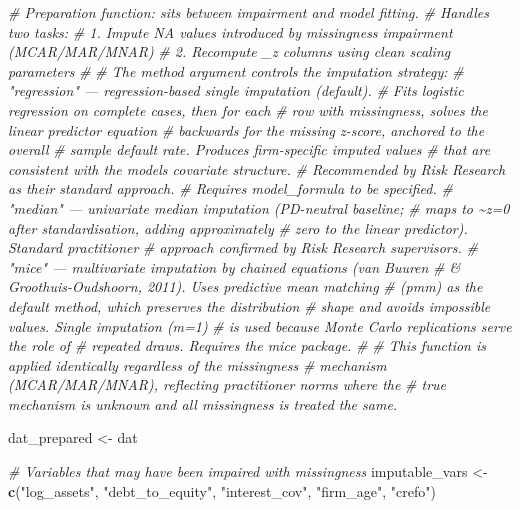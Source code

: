 \documentclass[
]{article}
\newenvironment{Shaded}{\begin{snugshade}}{\end{snugshade}}
\newcommand{\CommentTok}[1]{\textcolor[rgb]{0.56,0.35,0.01}{\textit{#1}}}
\newcommand{\FunctionTok}[1]{\textcolor[rgb]{0.13,0.29,0.53}{\textbf{#1}}}
\newcommand{\NormalTok}[1]{#1}
\newcommand{\OtherTok}[1]{\textcolor[rgb]{0.56,0.35,0.01}{#1}}
\newcommand{\StringTok}[1]{\textcolor[rgb]{0.31,0.60,0.02}{#1}}
\begin{document}
\begin{Shaded}
\begin{Highlighting}[]
  \CommentTok{\# Preparation function: sits between impairment and model fitting.}
  \CommentTok{\# Handles two tasks:}
  \CommentTok{\#   1. Impute NA values introduced by missingness impairment (MCAR/MAR/MNAR)}
  \CommentTok{\#   2. Recompute \_z columns using clean scaling parameters}
  \CommentTok{\#}
  \CommentTok{\# The method argument controls the imputation strategy:}
  \CommentTok{\#   "regression" — regression{-}based single imputation (default).}
  \CommentTok{\#              Fits logistic regression on complete cases, then for each}
  \CommentTok{\#              row with missingness, solves the linear predictor equation}
  \CommentTok{\#              backwards for the missing z{-}score, anchored to the overall}
  \CommentTok{\#              sample default rate. Produces firm{-}specific imputed values}
  \CommentTok{\#              that are consistent with the model\textquotesingle{}s covariate structure.}
  \CommentTok{\#              Recommended by Risk Research as their standard approach.}
  \CommentTok{\#              Requires model\_formula to be specified.}
  \CommentTok{\#   "median" — univariate median imputation (PD{-}neutral baseline;}
  \CommentTok{\#              maps to \textasciitilde{}z=0 after standardisation, adding approximately}
  \CommentTok{\#              zero to the linear predictor). Standard practitioner}
  \CommentTok{\#              approach confirmed by Risk Research supervisors.}
  \CommentTok{\#   "mice"  — multivariate imputation by chained equations (van Buuren}
  \CommentTok{\#              \& Groothuis{-}Oudshoorn, 2011). Uses predictive mean matching}
  \CommentTok{\#              (pmm) as the default method, which preserves the distribution}
  \CommentTok{\#              shape and avoids impossible values. Single imputation (m=1)}
  \CommentTok{\#              is used because Monte Carlo replications serve the role of}
  \CommentTok{\#              repeated draws. Requires the mice package.}
  \CommentTok{\#}
  \CommentTok{\# This function is applied identically regardless of the missingness}
  \CommentTok{\# mechanism (MCAR/MAR/MNAR), reflecting practitioner norms where the}
  \CommentTok{\# true mechanism is unknown and all missingness is treated the same.}
  
\NormalTok{  dat\_prepared }\OtherTok{\textless{}{-}}\NormalTok{ dat}
  
  \CommentTok{\# Variables that may have been impaired with missingness}
\NormalTok{  imputable\_vars }\OtherTok{\textless{}{-}} \FunctionTok{c}\NormalTok{(}\StringTok{"log\_assets"}\NormalTok{, }\StringTok{"debt\_to\_equity"}\NormalTok{, }\StringTok{"interest\_cov"}\NormalTok{, }\StringTok{"firm\_age"}\NormalTok{, }\StringTok{"crefo"}\NormalTok{)}
  


\end{Highlighting}
\end{Shaded}
\end{document}
